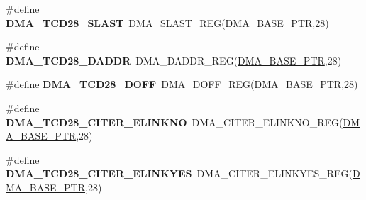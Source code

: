 \begin{DoxyCompactItemize}
\item 
\hypertarget{group___d_m_a___register___accessor___macros_gaf93ec456afa6c8ba453953c7f0ca3933}{}\#define {\bfseries D\+M\+A\+\_\+\+T\+C\+D28\+\_\+\+S\+L\+A\+S\+T}~D\+M\+A\+\_\+\+S\+L\+A\+S\+T\+\_\+\+R\+E\+G(\hyperlink{group___d_m_a___peripheral_ga6997fbc1b1973e9f27170217a3bd6f22}{D\+M\+A\+\_\+\+B\+A\+S\+E\+\_\+\+P\+T\+R},28)\label{group___d_m_a___register___accessor___macros_gaf93ec456afa6c8ba453953c7f0ca3933}

\item 
\hypertarget{group___d_m_a___register___accessor___macros_gacdf8d06abb48568c78fe6f0b3750fa79}{}\#define {\bfseries D\+M\+A\+\_\+\+T\+C\+D28\+\_\+\+D\+A\+D\+D\+R}~D\+M\+A\+\_\+\+D\+A\+D\+D\+R\+\_\+\+R\+E\+G(\hyperlink{group___d_m_a___peripheral_ga6997fbc1b1973e9f27170217a3bd6f22}{D\+M\+A\+\_\+\+B\+A\+S\+E\+\_\+\+P\+T\+R},28)\label{group___d_m_a___register___accessor___macros_gacdf8d06abb48568c78fe6f0b3750fa79}

\item 
\hypertarget{group___d_m_a___register___accessor___macros_ga3989b6d50d05bcef087bb7da35e6cfbd}{}\#define {\bfseries D\+M\+A\+\_\+\+T\+C\+D28\+\_\+\+D\+O\+F\+F}~D\+M\+A\+\_\+\+D\+O\+F\+F\+\_\+\+R\+E\+G(\hyperlink{group___d_m_a___peripheral_ga6997fbc1b1973e9f27170217a3bd6f22}{D\+M\+A\+\_\+\+B\+A\+S\+E\+\_\+\+P\+T\+R},28)\label{group___d_m_a___register___accessor___macros_ga3989b6d50d05bcef087bb7da35e6cfbd}

\item 
\hypertarget{group___d_m_a___register___accessor___macros_ga094a02c1551abd55c8cf11876bf2aedf}{}\#define {\bfseries D\+M\+A\+\_\+\+T\+C\+D28\+\_\+\+C\+I\+T\+E\+R\+\_\+\+E\+L\+I\+N\+K\+N\+O}~D\+M\+A\+\_\+\+C\+I\+T\+E\+R\+\_\+\+E\+L\+I\+N\+K\+N\+O\+\_\+\+R\+E\+G(\hyperlink{group___d_m_a___peripheral_ga6997fbc1b1973e9f27170217a3bd6f22}{D\+M\+A\+\_\+\+B\+A\+S\+E\+\_\+\+P\+T\+R},28)\label{group___d_m_a___register___accessor___macros_ga094a02c1551abd55c8cf11876bf2aedf}

\item 
\hypertarget{group___d_m_a___register___accessor___macros_ga07af2e8de0a2a2a2459b225e02513676}{}\#define {\bfseries D\+M\+A\+\_\+\+T\+C\+D28\+\_\+\+C\+I\+T\+E\+R\+\_\+\+E\+L\+I\+N\+K\+Y\+E\+S}~D\+M\+A\+\_\+\+C\+I\+T\+E\+R\+\_\+\+E\+L\+I\+N\+K\+Y\+E\+S\+\_\+\+R\+E\+G(\hyperlink{group___d_m_a___peripheral_ga6997fbc1b1973e9f27170217a3bd6f22}{D\+M\+A\+\_\+\+B\+A\+S\+E\+\_\+\+P\+T\+R},28)\label{group___d_m_a___register___accessor___macros_ga07af2e8de0a2a2a2459b225e02513676}


\end{DoxyCompactItemize}
